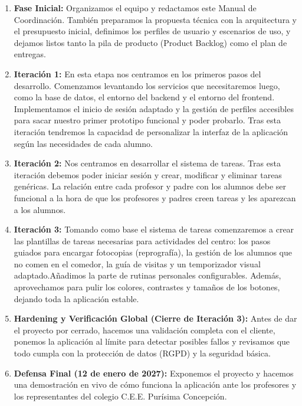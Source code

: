 \begin{enumerate}[leftmargin=*]
  \item \textbf{Fase Inicial:} Organizamos el equipo y redactamos este Manual de Coordinación. También preparamos la propuesta técnica con la arquitectura y el presupuesto inicial, definimos los perfiles de usuario y escenarios de uso, y dejamos listos tanto la pila de producto (Product Backlog) como el plan de entregas.
  \item \textbf{Iteración 1:} En esta etapa nos centramos en los primeros pasos del desarrollo. Comenzamos levantando los servicios que necesitaremos luego, como la base de datos, el entorno del backend y el entorno del frontend. Implementamos el inicio de sesión adaptado y la gestión de perfiles accesibles para sacar nuestro primer prototipo funcional y poder probarlo. Tras esta iteración tendremos la capacidad de personalizar la interfaz de la aplicación según las necesidades de cada alumno. 
  \item \textbf{Iteración 2:} Nos centramos en desarrollar el sistema de tareas. Tras esta iteración debemos poder iniciar sesión y crear, modificar y eliminar tareas genéricas. La relación entre cada profesor y padre con los alumnos debe ser funcional a la hora de que los profesores y padres creen tareas y les aparezcan a los alumnos. 
  \item \textbf{Iteración 3:} Tomando como base el sistema de tareas comenzaremos a crear las plantillas de tareas necesarias para actividades del centro: los pasos guiados para encargar fotocopias (reprografía), la gestión de los alumnos que no comen en el comedor, la guía de visitas y un temporizador visual adaptado.Añadimos la parte de rutinas personales configurables. Además, aprovechamos para pulir los colores, contrastes y tamaños de los botones, dejando toda la aplicación estable.
  \item \textbf{Hardening y Verificación Global (Cierre de Iteración 3):} Antes de dar el proyecto por cerrado, hacemos una validación completa con el cliente, ponemos la aplicación al límite para detectar posibles fallos y revisamos que todo cumpla con la protección de datos (RGPD) y la seguridad básica.
  \item \textbf{Defensa Final (12 de enero de 2027):} Exponemos el proyecto y hacemos una demostración en vivo de cómo funciona la aplicación ante los profesores y los representantes del colegio C.E.E. Purísima Concepción.
\end{enumerate}